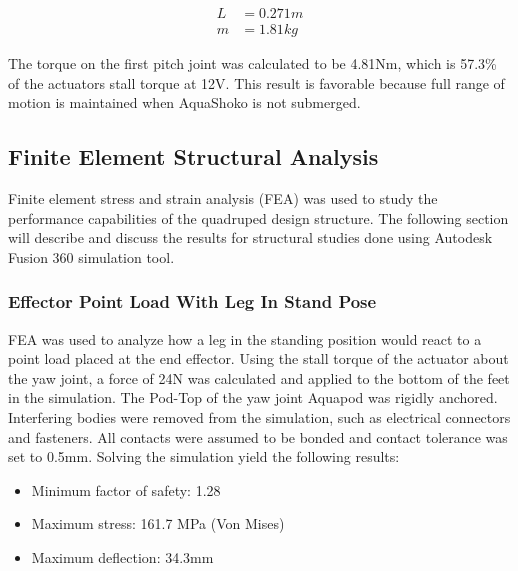 \begin{align}\label{eq:head-1}
    L & = 0.271 m         \\
    m & = 1.81 kg       
\end{align}


The torque on the first pitch joint was calculated to be 4.81Nm, which is 57.3\% of the actuators stall torque at 12V. This result is favorable because full range of motion is maintained when AquaShoko is not submerged.

\subsection{Finite Element Structural Analysis}
Finite element stress and strain analysis (FEA) was used to study the performance capabilities of the quadruped design structure. 
The following section will describe and discuss the results for structural studies done using Autodesk Fusion 360 simulation tool.

\subsubsection{Effector Point Load With Leg In Stand Pose }\label{sub:sub:Leg FEA} %
FEA was used to analyze how a leg in the standing position would react to a point load placed at the end effector. Using the stall torque of the actuator about the yaw joint, a force of 24N was calculated and applied to the bottom of the feet in the simulation. The Pod-Top of the yaw joint Aquapod was rigidly anchored. 
Interfering bodies were removed from the simulation, such as electrical connectors and fasteners. All contacts were assumed to be bonded and contact tolerance was set to 0.5mm.
Solving the simulation yield the following results:
 \begin{itemize}
     \item Minimum factor of safety: 1.28
     \item Maximum stress: 161.7 MPa (Von Mises)
     \item Maximum deflection: 34.3mm
 \end{itemize}




